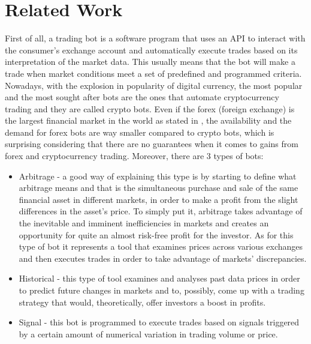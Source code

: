 \documentclass[12pt,a4paper]{report}
\begin{document}
\chapter{Related Work}
First of all, a trading bot is a software program that uses an API to interact with the consumer's exchange account and automatically execute trades based on its interpretation of the market data. This usually means that the bot will make a trade when market conditions meet a set of predefined and programmed criteria. Nowadays, with the explosion in popularity of digital currency, the most popular and the most sought after bots are the ones that automate cryptocurrency trading and they are called crypto bots. Even if the forex (foreign exchange) is the largest financial market in the world as stated in \cite{forex}, the availability and the demand for forex bots are way smaller compared to crypto bots, which is surprising considering that there are no guarantees when it comes to gains from forex and cryptocurrency trading. Moreover, there are 3 types of bots:
\begin{itemize}
	\item Arbitrage - a good way of explaining this type is by starting to define what arbitrage means and that is the simultaneous purchase and sale of the same financial asset in different markets, in order to make a profit from the slight differences in the asset's price. To simply put it, arbitrage takes advantage of the inevitable and imminent inefficiencies in markets and creates an opportunity for quite an almost risk-free profit for the investor. 
	As for this type of bot it represents a tool that examines prices across various exchanges and then executes trades in order to take advantage of markets' discrepancies.
	\item Historical - this type of tool examines and analyses past data prices in order to predict future changes in markets and to, possibly, come up with a trading strategy that would, theoretically, offer investors a boost in profits.
	\item Signal - this bot is programmed to execute trades based on signals triggered by a certain amount of numerical variation in trading volume or price.
\end{itemize}
\end{document}
